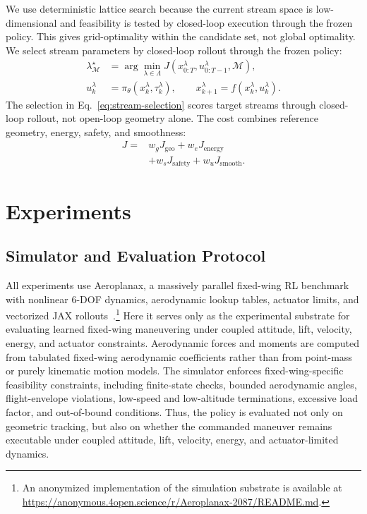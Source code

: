 \documentclass{article}
\begin{document}
We use deterministic lattice search because the current stream space is low-dimensional and feasibility is tested by closed-loop execution through the frozen policy.
This gives grid-optimality within the candidate set, not global optimality.
We select stream parameters by closed-loop rollout through the frozen policy:
\begin{align}
  \lambda_{\mathcal{M}}^\star
  &= \arg\min_{\lambda\in\Lambda}
  J(x_{0:T}^{\lambda},u_{0:T-1}^{\lambda},\mathcal{M}), \label{eq:stream-selection}\\
  u_k^\lambda &= \pi_\theta(x_k^\lambda,\tau_k^\lambda),\qquad
  x_{k+1}^\lambda=f(x_k^\lambda,u_k^\lambda). \nonumber
\end{align}
The selection in Eq.~\eqref{eq:stream-selection} scores target streams through closed-loop rollout, not open-loop geometry alone.
The cost combines reference geometry, energy, safety, and smoothness:
\begin{equation}
\label{eq:stream-cost}
\begin{aligned}
  J ={}& w_gJ_{\mathrm{geo}} + w_eJ_{\mathrm{energy}} \\
       &+ w_sJ_{\mathrm{safety}} + w_uJ_{\mathrm{smooth}} .
\end{aligned}
\end{equation}




\section{Experiments}

\subsection{Simulator and Evaluation Protocol}

All experiments use Aeroplanax, a massively parallel fixed-wing RL benchmark with nonlinear 6-DOF dynamics, aerodynamic lookup tables, actuator limits, and vectorized JAX rollouts~\citep{jax2018github,stevens2015aircraft,garza2003collection}.\footnote{An anonymized implementation of the simulation substrate is available at \url{https://anonymous.4open.science/r/Aeroplanax-2087/README.md}.}
Here it serves only as the experimental substrate for evaluating learned fixed-wing maneuvering under coupled attitude, lift, velocity, energy, and actuator constraints.
Aerodynamic forces and moments are computed from tabulated fixed-wing aerodynamic coefficients rather than from point-mass or purely kinematic motion models.
The simulator enforces fixed-wing-specific feasibility constraints, including finite-state checks, bounded aerodynamic angles, flight-envelope violations, low-speed and low-altitude terminations, excessive load factor, and out-of-bound conditions.
Thus, the policy is evaluated not only on geometric tracking, but also on whether the commanded maneuver remains executable under coupled attitude, lift, velocity, energy, and actuator-limited dynamics.
\end{document}
